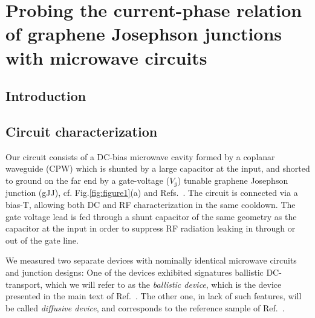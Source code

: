 \newchapstyle
\chapter{Probing the current-phase relation of graphene Josephson junctions
with microwave circuits}
\label{chap:gJJ-CPR}


\begin{abstract}
	We perform extensive analysis of graphene Josephson junctions embedded in microwave circuits.
	By comparing a diffusive junction at \SI{15}{\milli\kelvin} with a ballistic one at \SI{15}{\milli\kelvin} and \SI{1}{\kelvin}, we are able to reconstruct the current-phase relation.
\end{abstract}

\newpage

\section{Introduction}

\section{Circuit characterization}

Our circuit consists of a DC-bias microwave cavity formed by a coplanar waveguide (CPW) which is shunted by a large capacitor at the input, and shorted to ground on the far end by a gate-voltage ($V_g$) tunable graphene Josephson junction (gJJ), cf. Fig.\ref{fig:figure1}(a) and Refs.~\cite{schmidtBallisticGrapheneSuperconducting2018,schmidtCurrentDetectionUsing2020,bosmanBroadbandArchitectureGalvanically2015c}.
%
The circuit is connected via a bias-T, allowing both DC and RF characterization in the same cooldown.
%
The gate voltage lead is fed through a shunt capacitor of the same geometry as the capacitor at the input in order to suppress RF radiation leaking  in through or out of the gate line.

We measured two separate devices with nominally identical microwave circuits and junction designs:
%
One of the devices exhibited signatures ballistic DC-transport, which we will refer to as the \textit{ballistic device}, which is the device presented in the main text of Ref.~\cite{schmidtBallisticGrapheneSuperconducting2018}.
%
The other one, in lack of such features, will be called \textit{diffusive device}, and corresponds to the reference sample of Ref.~\cite{schmidtBallisticGrapheneSuperconducting2018}.

